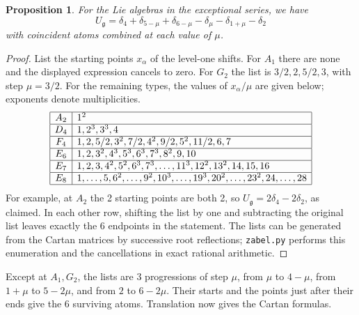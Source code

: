 \documentclass[11pt,reqno]{amsart}
\newtheorem{prop}[thm]{Proposition}
\theoremstyle{definition}
\numberwithin{equation}{section}
\begin{document}
\begin{prop}\label{prop:level-one}
For the Lie algebras in the exceptional series, we have
$$U_{\mathfrak g}=\delta_4+\delta_{5-\mu}+\delta_{6-\mu}-\delta_\mu-\delta_{1+\mu}-\delta_2$$
with coincident atoms combined at each value of $\mu$.
\end{prop}
\begin{proof}
List the starting points $x_\alpha$ of the level-one shifts. For $A_1$ there are none and the displayed expression cancels to zero. For $G_2$ the list is $3/2,2,5/2,3$, with step $\mu=3/2$. For the remaining types, the values of $x_\alpha/\mu$ are given below; exponents denote multiplicities.
$$\begin{array}{|c|l|}\hline
A_2&1^2\\\hline
D_4&1,2^3,3^3,4\\\hline
F_4&1,2,5/2,3^2,7/2,4^2,9/2,5^2,11/2,6,7\\\hline
E_6&1,2,3^2,4^3,5^3,6^3,7^3,8^2,9,10\\\hline
E_7&1,2,3,4^2,5^2,6^3,7^3,\ldots,11^3,12^2,13^2,14,15,16\\\hline
E_8&1,\ldots,5,6^2,\ldots,9^2,10^3,\ldots,19^3,20^2,\ldots,23^2,24,\ldots,28\\\hline
\end{array}$$
For example, at $A_2$ the 2 starting points are both 2, so $U_{\mathfrak g}=2\delta_4-2\delta_2$, as claimed. In each other row, shifting the list by one and subtracting the original list leaves exactly the 6 endpoints in the statement. The lists can be generated from the Cartan matrices by successive root reflections; \texttt{zabel.py} performs this enumeration and the cancellations in exact rational arithmetic.
\end{proof}

Except at $A_1,G_2$, the lists are 3 progressions of step $\mu$, from $\mu$ to $4-\mu$, from $1+\mu$ to $5-2\mu$, and from $2$ to $6-2\mu$. Their starts and the points just after their ends give the 6 surviving atoms. Translation now gives the Cartan formulas.
\end{document}
